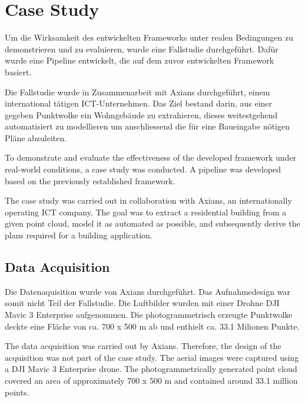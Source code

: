 \chapter{Case Study}
\label{sec:case_study}

\begin{German}
    Um die Wirksamkeit des entwickelten Frameworks unter realen Bedingungen zu demonstrieren und zu evaluieren, wurde eine Fallstudie durchgeführt. Dafür wurde eine Pipeline entwickelt, die auf dem zuvor entwickelten Framework basiert. 
    
    Die Fallstudie wurde in Zusammenarbeit mit Axians durchgeführt, einem international tätigen ICT-Unternehmen. Das Ziel bestand darin, aus einer gegeben Punktwolke ein Wohngebäude zu extrahieren, dieses weitestgehend automatisiert zu modellieren um anschliessend die für eine Baueingabe nötigen Pläne abzuleiten.     
\end{German}

\begin{English}
    To demonstrate and evaluate the effectiveness of the developed framework under real-world conditions, a case study was conducted. A pipeline was developed based on the previously established framework.
    
    The case study was carried out in collaboration with Axians, an internationally operating ICT company. The goal was to extract a residential building from a given point cloud, model it as automated as possible, and subsequently derive the plans required for a building application.
\end{English}


\section{Data Acquisition}
\begin{German}
    Die Datenaquisition wurde von Axians durchgeführt. Das Aufnahmedesign war somit nicht Teil der Fallstudie. Die Luftbilder wurden mit einer Drohne DJI Mavic 3 Enterprise aufgenommen. Die photogrammetrisch erzeugte Punktwolke deckte eine Fläche von ca. 700 x 500 m ab und enthielt ca. 33.1 Milionen Punkte.
\end{German}

\begin{English}
    The data acquisition was carried out by Axians. Therefore, the design of the acquisition was not part of the case study. The aerial images were captured using a DJI Mavic 3 Enterprise drone. The photogrammetrically generated point cloud covered an area of approximately 700 x 500 m and contained around 33.1 million points.
\end{English}

